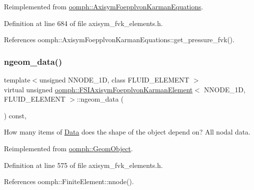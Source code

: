 Reimplemented from \hyperlink{classoomph_1_1AxisymFoepplvonKarmanEquations_acadd8cb7ef617690c79c0c76d7ed0000}{oomph\+::\+Axisym\+Foepplvon\+Karman\+Equations}.



Definition at line 684 of file axisym\+\_\+fvk\+\_\+elements.\+h.



References oomph\+::\+Axisym\+Foepplvon\+Karman\+Equations\+::get\+\_\+pressure\+\_\+fvk().

\mbox{\label{classoomph_1_1FSIAxisymFoepplvonKarmanElement_ad3b508a8c906a3e175f9c058a0103023}} 
\subsubsection{\texorpdfstring{ngeom\+\_\+data()}{ngeom\_data()}}
{\footnotesize\ttfamily template$<$unsigned N\+N\+O\+D\+E\+\_\+1D, class F\+L\+U\+I\+D\+\_\+\+E\+L\+E\+M\+E\+NT $>$ \\
virtual unsigned \hyperlink{classoomph_1_1FSIAxisymFoepplvonKarmanElement}{oomph\+::\+F\+S\+I\+Axisym\+Foepplvon\+Karman\+Element}$<$ N\+N\+O\+D\+E\+\_\+1D, F\+L\+U\+I\+D\+\_\+\+E\+L\+E\+M\+E\+NT $>$\+::ngeom\+\_\+data (\begin{DoxyParamCaption}{ }\end{DoxyParamCaption}) const\hspace{0.3cm}{\ttfamily [inline]}, {\ttfamily [virtual]}}



How many items of \hyperlink{classoomph_1_1Data}{Data} does the shape of the object depend on? All nodal data. 



Reimplemented from \hyperlink{classoomph_1_1GeomObject_a19d325347e19964e127fe124df56f251}{oomph\+::\+Geom\+Object}.



Definition at line 575 of file axisym\+\_\+fvk\+\_\+elements.\+h.



References oomph\+::\+Finite\+Element\+::nnode().

\mbox{\label{classoomph_1_1FSIAxisymFoepplvonKarmanElement_a21466ab3a24ac1f97af078a559a5679b}} 
